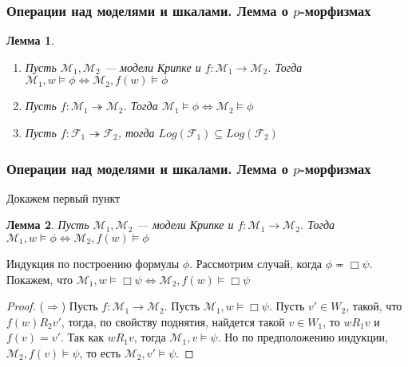 \documentclass[pdf,utf8,russian,aspectratio=169]{beamer}
\newtheorem{lem}{Лемма}
\begin{document}
\begin{frame}
  \frametitle{Операции над моделями и шкалами. Лемма о $p$-морфизмах}

  \begin{lem}
    \begin{enumerate}
      \item Пусть $\mathcal{M}_1, \mathcal{M}_2$ --- модели Крипке и $f : \mathcal{M}_1 \to \mathcal{M}_2$. Тогда
      $\mathcal{M}_1, w \models \phi \Leftrightarrow \mathcal{M}_2, f(w) \models \phi$
      \item Пусть $f : \mathcal{M}_1 \twoheadrightarrow \mathcal{M}_2$. Тогда
      $\mathcal{M}_1 \models \phi \Leftrightarrow \mathcal{M}_2 \models \phi$
      \item Пусть $f: \mathcal{F}_1 \twoheadrightarrow \mathcal{F}_2$, тогда $Log(\mathcal{F}_1) \subseteq Log(\mathcal{F}_2)$
    \end{enumerate}
  \end{lem}
\end{frame}

\begin{frame}
  \frametitle{Операции над моделями и шкалами. Лемма о $p$-морфизмах}

  Докажем первый пункт

  \begin{lem}
    Пусть $\mathcal{M}_1, \mathcal{M}_2$ --- модели Крипке и $f : \mathcal{M}_1 \to \mathcal{M}_2$. Тогда
    $\mathcal{M}_1, w \models \phi \Leftrightarrow \mathcal{M}_2, f(w) \models \phi$
  \end{lem}

Индукция по построению формулы $\phi$. Рассмотрим случай, когда $\phi \eqcirc \Box \psi$. Покажем, что $\mathcal{M}_1, w \models \Box \psi \Leftrightarrow \mathcal{M}_2, f(w) \models \Box \psi$

  \begin{proof}
    ($\Rightarrow$) Пусть $f : \mathcal{M}_1 \to \mathcal{M}_2$. Пусть $\mathcal{M}_1, w \models \Box \psi$. Пусть $v' \in W_2$, такой, что $f(w) R_2 v'$, тогда, по свойству поднятия, найдется такой $v \in W_1$, то $w R_1 v$ и $f(v) = v'$. Так как $w R_1 v$, тогда $\mathcal{M}_1, v \models \psi$. Но по предположению индукции, $\mathcal{M}_2, f(v) \models \psi$, то есть $\mathcal{M}_2, v' \models \psi$.
  \end{proof}
\end{frame}
\end{document}
